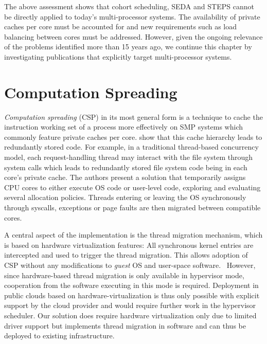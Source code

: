 \documentclass[12pt,a4paper]{book}
\begin{document}
The above assessment shows that cohort scheduling, SEDA and STEPS cannot be directly applied to today's multi-processor systems.
The availability of private caches per core must be accounted for and new requirements such as load balancing between cores must be addressed.
However, given the ongoing relevance of the problems identified more than 15 years ago, we continue this chapter by investigating publications that explicitly target multi-processor systems.

\section{Computation Spreading}\label{ch:relwork:compspr}
\emph{Computation spreading} (CSP) in its most general form is a technique to cache the instruction working set of a process more effectively on SMP systems which commonly feature private caches per core.
\citeauthor*{compspr} show that this cache hierarchy leads to redundantly stored code.
For example, in a traditional thread-based concurrency model, each request-handling thread may interact with the file system through system calls which leads to redundantly stored file system code being in each core's private cache.
The authors present a solution that temporarily assigns CPU cores to either execute OS code or user-level code, exploring and evaluating several allocation policies.
Threads entering or leaving the OS synchronously through syscalls, exceptions or page faults are then migrated between compatible cores.~\cite{compspr}

A central aspect of the implementation is the thread migration mechanism, which is based on hardware virtualization features:
All synchronous kernel entries are intercepted and used to trigger the thread migration.
This allows adoption of CSP without any modifications to \textit{guest} OS and user-space software.~\cite{compspr}
However, since hardware-based thread migration is only available in hypervisor mode, cooperation from the software executing in this mode is required.
Deployment in public clouds based on hardware-virtualization is thus only possible with explicit support by the cloud provider and would require further work in the hypervisor scheduler.
Our solution does require hardware virtualization only due to limited driver support but implements thread migration in software and can thus be deployed to existing infrastructure.
\end{document}
